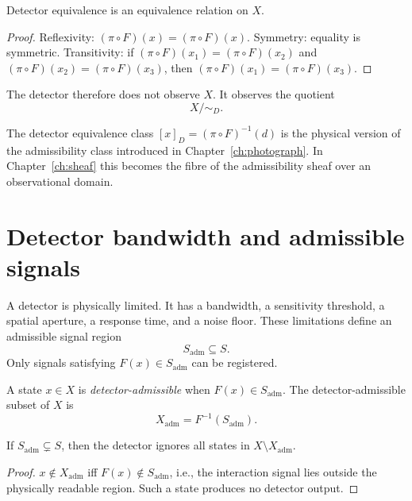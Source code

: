 \begin{proposition}
  Detector equivalence is an equivalence relation on $X$.
\end{proposition}

\begin{proof}
  Reflexivity: $(\pi\circ F)(x) = (\pi\circ F)(x)$.
  Symmetry: equality is symmetric.
  Transitivity: if $(\pi\circ F)(x_1) = (\pi\circ F)(x_2)$
  and $(\pi\circ F)(x_2) = (\pi\circ F)(x_3)$, then
  $(\pi\circ F)(x_1) = (\pi\circ F)(x_3)$.
\end{proof}

The detector therefore does not observe $X$.
It observes the quotient
\[
  X / {\sim_D}.
\]

\begin{ForwardRef}
  The detector equivalence class $[x]_D = (\pi\circ F)^{-1}(d)$
  is the physical version of the admissibility class introduced
  in Chapter~\ref{ch:photograph}.
  In Chapter~\ref{ch:sheaf} this becomes the fibre of the
  admissibility sheaf over an observational domain.
\end{ForwardRef}

\section{Detector bandwidth and admissible signals}

A detector is physically limited.
It has a bandwidth, a sensitivity threshold, a spatial
aperture, a response time, and a noise floor.
These limitations define an admissible signal region
\[
  S_{\mathrm{adm}} \subseteq S.
\]
Only signals satisfying $F(x) \in S_{\mathrm{adm}}$ can be
registered.

\begin{definition}
  A state $x \in X$ is \emph{detector-admissible} when
  $F(x) \in S_{\mathrm{adm}}$.
  The detector-admissible subset of $X$ is
  \[
    X_{\mathrm{adm}} = F^{-1}(S_{\mathrm{adm}}).
  \]
\end{definition}

\begin{proposition}
  If $S_{\mathrm{adm}} \subsetneq S$, then the detector
  ignores all states in $X \setminus X_{\mathrm{adm}}$.
\end{proposition}

\begin{proof}
  $x \notin X_{\mathrm{adm}}$ iff $F(x) \notin S_{\mathrm{adm}}$,
  i.e., the interaction signal lies outside the physically
  readable region.
  Such a state produces no detector output.
\end{proof}

